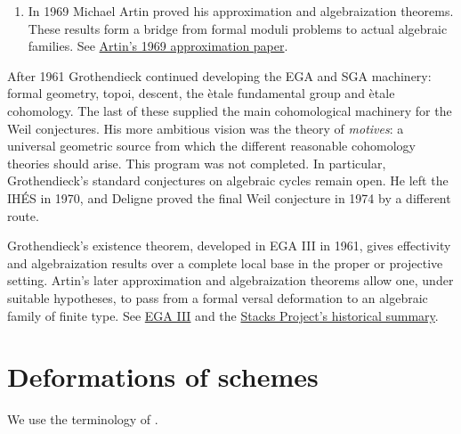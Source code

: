 \begin{enumerate}
\item In 1969 Michael Artin proved his
approximation and algebraization theorems.
These results form a bridge from formal
moduli problems to actual algebraic
families. See
\href{https://www.numdam.org/articles/10.1007/BF02684596/}
{Artin's 1969 approximation paper}.
\end{enumerate}

\noindent
After 1961 Grothendieck continued developing
the EGA and SGA machinery: formal geometry,
topoi, descent, the \`etale fundamental
group and \`etale cohomology. The last of
these supplied the main cohomological
machinery for the Weil conjectures. His more
ambitious vision was the theory of
\emph{motives}: a universal geometric source
from which the different reasonable
cohomology theories should arise. This
program was not completed. In particular,
Grothendieck's standard conjectures on
algebraic cycles remain open. He left the
IH\'ES in 1970, and Deligne proved the final
Weil conjecture in 1974 by a different
route.

\begin{remark}[Algebraization]
Grothendieck's existence theorem, developed
in EGA III in 1961, gives effectivity and
algebraization results over a complete local
base in the proper or projective setting.
Artin's later approximation and
algebraization theorems allow one, under
suitable hypotheses, to pass from a formal
versal deformation to an algebraic family
of finite type. See
\href{https://www.numdam.org/item/?id=PMIHES_1961__11__5_0}
{EGA III} and the
\href{https://stacks.math.columbia.edu/tag/04UW}
{Stacks Project's historical summary}.

\end{remark}


\section{Deformations of schemes}
\label{section-deformations-of-schemes}

\noindent
We use the terminology of \cite{Sernesi-deformations}.

